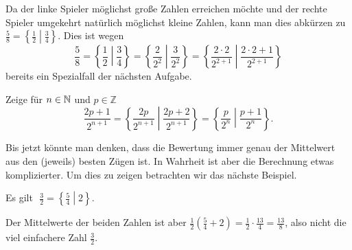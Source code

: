 \documentclass{zirkelbrief1516}
\newcommand{\ZZ}{\mathbb{Z}}
\begin{document}
Da der linke Spieler m\"oglichst gro\ss e Zahlen erreichen m\"ochte und der rechte Spieler umgekehrt nat\"urlich m\"oglichst kleine Zahlen, kann man dies abk\"urzen zu
$ \frac 58 = \left\{ \frac 12 \middle| \frac 34 \right\}$.
Dies ist wegen
\[ \frac 58 = \left\{ \frac 12 \middle| \frac 34 \right\} = \left\{ \frac{2}{2^2} \middle| \frac{3}{2^2} \right\} = \left\{ \frac{2\cdot 2}{2^{2+1}} \middle| \frac{2\cdot 2 + 1}{2^{2+1}} \right\}\]
bereits ein Spezialfall der n\"achsten Aufgabe.

\begin{aufgabe}
  Zeige für $n\in\mathbb{N}$ und $p\in\ZZ$
  \begin{equation*}
    \frac{2p+1}{2^{n+1}}=\left\{\frac{2p}{2^{n+1}}\middle|\frac{2p+2}{2^{n+1}}\right\}=\left\{\frac{p}{2^n}\middle|\frac{p+1}{2^n}\right\}.
  \end{equation*}
\end{aufgabe}

  Bis jetzt k\"onnte man denken, dass die Bewertung immer genau der Mittelwert aus den (jeweils) besten Zügen ist. In Wahrheit ist aber die Berechnung etwas komplizierter. Um dies zu zeigen betrachten wir das n\"achste Beispiel.

\begin{thm}
  Es gilt~\,$\displaystyle\frac{3}{2}=\left\{\frac{5}{4}\middle|2\right\}$.
\end{thm}

Der Mittelwerte der beiden Zahlen ist aber $\frac 12 \left( \frac 54 + 2 \right)=\frac 12 \cdot \frac{13}4 = \frac{13}8$, also nicht die viel einfachere Zahl $\frac 32$.
\end{document}
